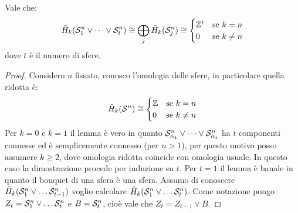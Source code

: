 \begin{lemma}
  Vale che:
  \[
    \tilde{H}_k(\mathcal{S}^{n}_{1} \vee \dots \vee \mathcal{S}^{n}_{t}) \cong \bigoplus_j \tilde{H}_k(\mathcal{S}^{n}_{j}) \cong
    \begin{cases}
      \mathbb{Z}^t & \text{se $ k = n $} \\
      0 & \text{se $ k \not =  n $}
    \end{cases}
  \]
  dove $ t $ è il numero di sfere.
\end{lemma}
\begin{proof}
  Considero $ n $ fissato, conosco l'omologia delle sfere,
  in particolare quella ridotta è:
  \[
    \tilde{H}_k(\mathcal{S}^{n}) \cong
    \begin{cases}
      \mathbb{Z}     & \text{se } k = n \\
      0      & \text{se } k \not = n
    \end{cases}
  \]
  Per $ k = 0 $ e $ k = 1 $ il lemma è vero in quanto
  $ \mathcal{S}^{n}_{\alpha_1} \vee \dots \vee \mathcal{S}^{n}_{\alpha_t} $ ha $ t $ componenti connesse ed è
  semplicemente connesso (per $ n > 1 $), per questo motivo posso assumere
  $ k \geq 2 $, dove omologia ridotta coincide con omologia usuale. In questo caso
  la dimostrazione procede per induzione su $ t $. Per $ t = 1 $ il lemma è
  banale in quanto il bouquet di una sfera è una sfera. Assumo di
  conoscere $ \tilde{H}_k(\mathcal{S}^{n}_1 \vee \dots \mathcal{S}^{n}_{t-1}) $ voglio calcolare
  $ \tilde{H}_k(\mathcal{S}^{n}_1 \vee \dots \mathcal{S}^{n}_t) $. Come notazione pongo
  $ Z_t = \mathcal{S}^{n}_1 \vee \dots \mathcal{S}^{n}_t $ e $ B = \mathcal{S}^{n}_t $, cioè vale che
  $ Z_t = Z_{t-1} \vee B $.


\end{proof}
